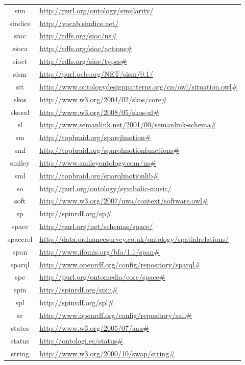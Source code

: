 \documentclass{article}
\begin{document}
\begin{longtable}{ c | p{8cm} }
		sim & \url{http://purl.org/ontology/similarity/} \\
		sindice & \url{http://vocab.sindice.net/} \\
		sioc & \url{http://rdfs.org/sioc/ns#} \\
		sioca & \url{http://rdfs.org/sioc/actions#} \\
		sioct & \url{http://rdfs.org/sioc/types#} \\
		sism & \url{http://purl.oclc.org/NET/sism/0.1/} \\
		sit & \url{http://www.ontologydesignpatterns.org/cp/owl/situation.owl#} \\
		skos & \url{http://www.w3.org/2004/02/skos/core#} \\
		skosxl & \url{http://www.w3.org/2008/05/skos-xl#} \\
		sl & \url{http://www.semanlink.net/2001/00/semanlink-schema#} \\
		sm & \url{http://topbraid.org/sparqlmotion#} \\
		smf & \url{http://topbraid.org/sparqlmotionfunctions#} \\
		smiley & \url{http://www.smileyontology.com/ns#} \\
		sml & \url{http://topbraid.org/sparqlmotionlib#} \\
		so & \url{http://purl.org/ontology/symbolic-music/} \\
		soft & \url{http://www.w3.org/2007/uwa/context/software.owl#} \\
		sp & \url{http://spinrdf.org/sp#} \\
		space & \url{http://purl.org/net/schemas/space/} \\
		spacerel & \url{http://data.ordnancesurvey.co.uk/ontology/spatialrelations/} \\
		span & \url{http://www.ifomis.org/bfo/1.1/span#} \\
		sparql & \url{http://www.openrdf.org/config/repository/sparql#} \\
		spc & \url{http://purl.org/ontomedia/core/space#} \\
		spin & \url{http://spinrdf.org/spin#} \\
		spl & \url{http://spinrdf.org/spl#} \\
		sr & \url{http://www.openrdf.org/config/repository/sail#} \\
		states & \url{http://www.w3.org/2005/07/aaa#} \\
		status & \url{http://ontologi.es/status#} \\
		string & \url{http://www.w3.org/2000/10/swap/string#} \\

\end{longtable}
\end{document}
